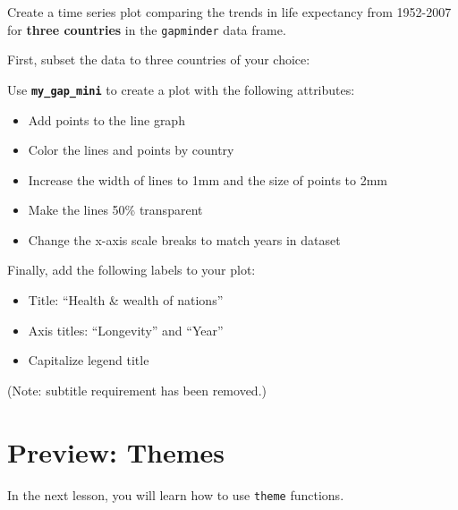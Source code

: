 \documentclass[
  letterpaper,
  DIV=11,
  numbers=noendperiod]{scrreprt}
\begin{document}
\begin{tcolorbox}[enhanced jigsaw, colframe=quarto-callout-tip-color-frame, rightrule=.15mm, opacityback=0, breakable, coltitle=black, colbacktitle=quarto-callout-tip-color!10!white, bottomrule=.15mm, leftrule=.75mm, toprule=.15mm, arc=.35mm, bottomtitle=1mm, colback=white, left=2mm, opacitybacktitle=0.6, titlerule=0mm, title=\textcolor{quarto-callout-tip-color}{\faLightbulb}\hspace{0.5em}{Practice}, toptitle=1mm]

Create a time series plot comparing the trends in life expectancy from
1952-2007 for \textbf{three countries} in the \texttt{gapminder} data
frame.

First, subset the data to three countries of your choice:

Use \textbf{\texttt{my\_gap\_mini}} to create a plot with the following
attributes:

\begin{itemize}
\item
  Add points to the line graph
\item
  Color the lines and points by country
\item
  Increase the width of lines to 1mm and the size of points to 2mm
\item
  Make the lines 50\% transparent
\item
  Change the x-axis scale breaks to match years in dataset
\end{itemize}

Finally, add the following labels to your plot:

\begin{itemize}
\item
  Title: ``Health \& wealth of nations''
\item
  Axis titles: ``Longevity'' and ``Year''
\item
  Capitalize legend title
\end{itemize}

(Note: subtitle requirement has been removed.)

\end{tcolorbox}

\hypertarget{preview-themes}{%
\section{Preview: Themes}\label{preview-themes}}

In the next lesson, you will learn how to use \texttt{theme} functions.
\end{document}
